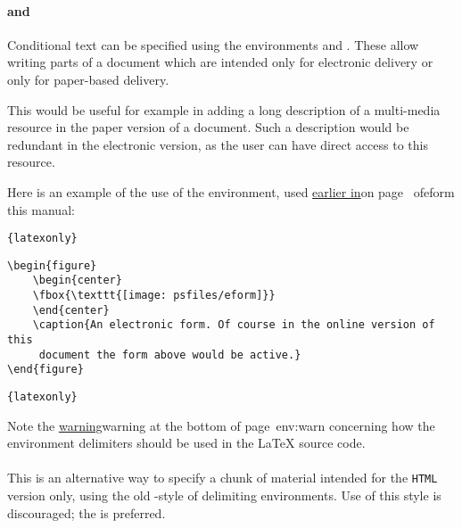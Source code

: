 \paragraph*{ and 
\label{latexonly}\label{htmlonly}}
Conditional text can be specified
using the environments  and . 
These allow writing parts of a document which are intended 
only for electronic delivery or only for paper-based delivery.

This would be useful for example in adding a long description of a
multi-media resource in the paper version of a document. 
Such a description would be redundant in the electronic version, 
as the user can have direct access to this resource. 

\medskip\goodbreak\noindent
Here is an example of the use of the  environment,
used \hyperref[page]{earlier in}{on page~}{ of}{eform} this manual:
\begin{small}\indent
\verb|{latexonly}|
\latex{\vskip-\baselineskip\vskip-\baselineskip}
\begin{verbatim}
\begin{figure}
    \begin{center}
    \fbox{\texttt{[image: psfiles/eform]}}
    \end{center}
    \caption{An electronic form. Of course in the online version of this
     document the form above would be active.}
\end{figure}
\end{verbatim}
\latex{\nobreak\vskip-\baselineskip\nobreak\indent\indent}%
\verb|{latexonly}|
\end{small}\goodbreak\medskip

\noindent
Note the \hyperref[page]{warning}{warning at the bottom of page~}{}{env:warn}
concerning how the environment delimiters should be used in the
\LaTeX{} source code.


%
\paragraph*{\label{endhtmlonly}}
This is an alternative way to specify a chunk of material intended
for the \texttt{HTML} version only,
using the old \AmS-style of delimiting environments.
Use of this style is discouraged; 
the   is preferred.%


